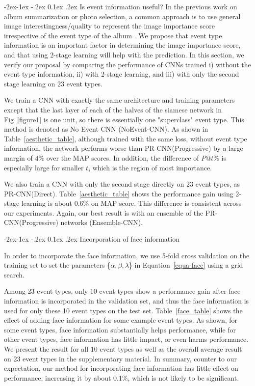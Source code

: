 \documentclass[10pt,twocolumn,letterpaper]{article}
\makeatletter
\renewcommand\subsubsection{\@startsection{subsubsection}{3}{\z@}%
                {-2ex\@plus -1ex \@minus -.2ex}%
                {0.1ex \@plus .2ex}%
                {\normalfont\normalsize\bfseries}}
\makeatother
\begin{document}
\subsubsection{Is event information useful?}
In the previous work on album summarization or photo selection, a common approach is to use general image interestingness/quality to represent the image importance score irrespective of the event type of the album \cite{photo_selection1, vacation, sum_pinaki}. We propose that event type information is an important factor in determining the image importance score,  and that using 2-stage learning will help with the prediction. In this section, we verify our proposal by comparing the performance of CNNs trained i) without the event type information, ii) with 2-stage learning, and iii) with only the second stage learning on 23 event types. 

We train a CNN with exactly the same architecture and training parameters except that the last layer of each of the halves of the siamese network in Fig~\ref{figure1} is one unit, so there is essentially one "superclass" event type. This method is denoted as No Event CNN (NoEvent-CNN).  As shown in Table~\ref{aesthetic_table}, although trained with the same loss, without event type information, the network performs worse than PR-CNN(Progressive) by a large margin of 4\% over the MAP scores. In addition, the difference of $P@t\%$ is especially large for smaller $t$, which is the region of most importance.

We also train a CNN with only the second stage directly on 23 event types, as PR-CNN(Direct). Table~\ref{aesthetic_table} shows the performance gain using 2-stage learning is about 0.6\% on MAP score. This difference is consistent across our experiments. Again, our best result is with an ensemble of the PR-CNN(Progressive) networks (Ensemble-CNN).

\subsubsection{Incorporation of face information}

In order to incorporate the face information, we use 5-fold cross validation on the training set to set the parameters \{$\alpha, \beta, \lambda$\} in Equation~\ref{equa-face} using a grid search.

Among 23 event types, only 10 event types show a performance gain after face information is incorporated in the validation set, and thus the face information is used for only these 10 event types on the test set. Table~\ref{face_table} shows the effect of adding face information for some example event types. As shown, for some event types, face information substantially helps performance, while for other event types, face information has little impact, or even harms performance. We present the result for all 10 event types as well as the overall average result on 23 event types in the supplementary material. In summary, counter to our expectation, our method for incorporating face information has little effect on performance, increasing it by about 0.1\%, which is not likely to be significant. 
\end{document}
